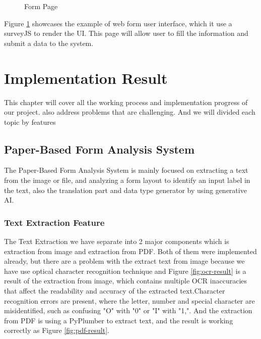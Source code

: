 \documentclass[12pt,oneside,openright,a4paper]{cpe-english-project}
\begin{document}
\begin{figure}[!h]
\centering
{}
\caption{Form Page}\label{fig:form-page}
\end{figure}

Figure \ref{fig:form-page} showcases the example of web form user interface, which it use a surveyJS to render the UI. This  page will allow user to fill the information and submit a data to the system.


\chapter{Implementation Result}

This chapter will cover all the working process and implementation progress of our project. also address problems that are challenging. And we will divided each topic by features

\section{Paper-Based Form Analysis System}

The Paper-Based Form Analysis System is mainly focused on extracting a text from the image or file, and analyzing a form layout to identify an input label in the text, also the translation part and data type generator by using generative AI.

\subsection{Text Extraction Feature}
The Text Extraction we have separate into 2 major components which is extraction from image and extraction from PDF. Both of them were implemented already, but there are a problem with the extract text from image because we have use optical character recognition technique and Figure \ref{fig:ocr-result} is a result of the extraction from image, which  contains multiple OCR inaccuracies that affect the readability and accuracy of the extracted text.Character recognition errors are present, where the letter, number and special character are misidentified, such as confusing "O" with "0" or "I" with "1,". And the extraction from PDF is using a PyPlumber to extract text, and the result is working correctly as Figure \ref{fig:pdf-result}.
\end{document}
